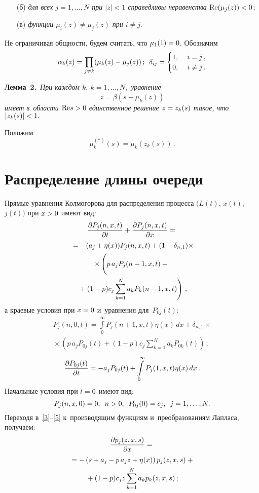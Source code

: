 \begin{multicols}{2}
\begin{itemize}
\item[(б)] \textit{для всех $j=1,\ldots,N$ при $|z|< 1$ справедливы 
неравенства} $\mathrm{Re} (\mu_j(z))\hm< 0$;

\item[(в)]  \textit{функции $\mu_i(z)\ne\mu_j(z)$ при $i\ne j$}.
\end{itemize}

Не ограничивая общности, будем считать, что $\mu_1(1)\hm=0$.
Обозначим
$$
\alpha_k(z)=\prod\limits_{j\ne k}(\mu_k(z)-\mu_j(z))\,;\enskip \delta_{ij}=\begin{cases}
1,&\ i=j\,,\\
0,&\ i\ne j\,.
\end{cases}
$$

\noindent
\textbf{Лемма~2.}\
\textit{При каждом $k,\ k=1,\ldots,N,$ уравнение}
$$
z=\beta\left(s-\mu_k(z)\right)
$$
\textit{имеет в~области $\mathrm{Re} s\hm>0$ единственное решение $z\hm=z_k(s)$ такое, 
что $|z_k(s)|\hm<1.$}

\smallskip

Положим
$$
\mu_k^{(\ast)}(s)=\mu_k\left(z_k(s)\right)\,.
$$

\section{Распределение длины очереди}

Прямые уравнения Колмогорова для распределения процесса $(L(t)$, $x(t)$,
$j(t))$ при $x\hm>0$ имеют вид:
\begin{multline}
\label{3}
\fr{\partial P_j(n,x,t)}{\partial t}+\fr{\partial P_j(n,x,t)}{\partial x}={}\\
{}=-(a_j+\eta(x))P_j(n,x,t)+(1-\delta_{n,1})\times
\\
\times\left(\vphantom{\sum\limits_{k=1}^N }
p\, a_jP_j(n-1,x,t)+{}\right.\\
\left.{}+(1-p) c_j\sum\limits_{k=1}^N a_kP_k(n-1,x,t)\right)\,,
\end{multline}
а краевые условия при $x\hm=0$ и~уравнения для~$P_{0j}(t)$:
\begin{multline}
\label{4}
P_j(n,0,t)=\int\limits_0^{\infty}P_j(n+1,x,t)\eta(x)\,dx+
\delta_{n,1}\times{}\\
{}\times \left(p\, a_j P_{0j}(t)+
(1-p)c_j\sum\limits_{k=1}^Na_kP_{0k}(t)\right)\,;
\end{multline}
\begin{equation}
\label{5}
\displaystyle\frac{\displaystyle \partial P_{0j}(t)\mathstrut}{\displaystyle \partial t\mathstrut}=-a_jP_{0j}(t)+
\int\limits_0^{\infty}P_j(1,x,t)\eta(x)\,dx\,.
\end{equation}
Начальные условия при $t\hm=0$ имеют вид:
$$
P_j(n,x,0)=0,\enskip n>0,\enskip P_{0j}(0)=c_j,\enskip j=1,\ldots,N.
$$
Переходя в~\eqref{3}--\eqref{5} к~производящим функциям и~преобразованиям Лапласа, 
получаем:
\begin{multline}
\label{6}
\displaystyle\frac{\displaystyle \partial p_j(z,x,s)\mathstrut}{\displaystyle \partial x\mathstrut}={}\\
{}=-\left(s+a_j-p\,a_jz+\eta(x)\right)p_j(z,x,s)+{}\\
{}+
(1-p)c_jz\sum\limits_{k=1}^Na_kp_k(z,x,s)\,;
\end{multline}


\end{multicols}
